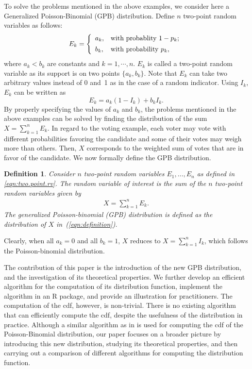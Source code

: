 \documentclass[12pt]{article}
\newtheorem{defn}{Definition}
\begin{document}
To solve the problems mentioned in the above examples, we consider here a Generalized Poisson-Binomial (GPB) distribution. Define $n$ two-point random variables as follows:
\begin{align}\label{eqn:two.point.rv}
E_k=\left\{
        \begin{array}{ll}
          a_k, & \hbox{with probablity } 1-p_k; \\[1ex]
          b_k, & \hbox{with probability } p_k,
        \end{array}
      \right.
\end{align}
where $a_k<b_k$ are constants and $k=1, \cdots, n$. $E_k$ is called a two-point random variable as its support is on two points $\{a_k, b_k\}$. Note that $E_k$ can take two arbitrary values instead of 0 and~1 as in the case of a random indicator. Using $I_k$, $E_k$ can be written as
$$E_k=a_k(1-I_k)+b_kI_k.$$
By properly specifying the values of $a_k$ and $b_k$, the problems mentioned in the above examples can be solved by finding the distribution of the sum $X=\sum_{k=1}^{n}E_k$. In regard to the voting example, each voter may vote with different probabilities favoring the candidate and some of their votes may weigh more than others. Then, $X$ corresponds to the weighted sum of votes that are in favor of the candidate.
We now formally define the GPB distribution.

\begin{defn}
Consider $n$ two-point random variables $E_1,\dots, E_n$ as defined in \eqref{eqn:two.point.rv}. The random variable of interest is the sum of the $n$ two-point random variables given by
\begin{align}\label{eqn:definition}
X=\sum_{k=1}^n E_k.
\end{align}
The generalized Poisson-binomial (GPB) distribution is defined as the distribution of $X$ in~(\ref{eqn:definition}).
\end{defn}
Clearly, when all $a_k=0$ and all $b_k=1$, $X$ reduces to $X=\sum_{k=1}^{n}I_k$, which follows the Poisson-binomial distribution.

The contribution of this paper is the introduction of the new GPB distribution, and the investigation of its theoretical properties. We further develop an efficient algorithm for the computation of its distribution function, implement the algorithm in an R package, and provide an illustration for practitioners. The computation of the cdf, however, is non-trivial. There is no existing algorithm that can efficiently compute the cdf, despite the usefulness of the distribution in practice. Although a similar algorithm as in  is used for computing the cdf of the Poisson-Binomial distribution, our paper focuses on a broader picture by introducing this new distribution, studying its theoretical properties, and then carrying out a comparison of different algorithms for computing the distribution function.
\end{document}
